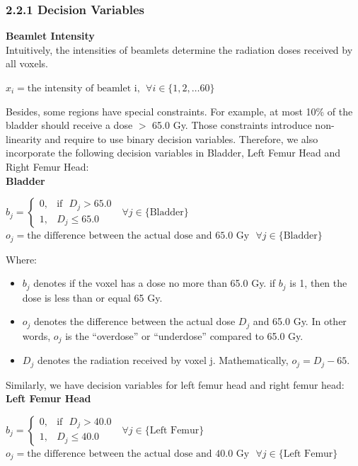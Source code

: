 \documentclass{report}
\begin{document}
\subsubsection{2.2.1 Decision Variables}

\textbf{Beamlet Intensity}\\
Intuitively, the intensities of beamlets determine the radiation doses received by all voxels. 
\begin{center}
    $x_i = \text{the intensity of beamlet i}, ~~ \forall i \in \{1, 2, \dotsc 60\}$
\end{center}

Besides, some regions have special constraints. For example, at most 10\% of the bladder should receive a dose $>$ 65.0 Gy. Those constraints introduce non-linearity and require to use binary decision variables. Therefore, we also incorporate the following decision variables in Bladder, Left Femur Head and Right Femur Head:\\


\textbf{Bladder}
\begin{center}
    $b_j= 
\begin{cases}
    0,& \text{if}~~~ D_j > 65.0\\
    1,              & D_j \leq 65.0
\end{cases} ~~~\forall j \in \{\text{Bladder}\}$\\

    $o_j = \text{the difference between the actual dose and 65.0 Gy} ~~~ \forall j \in \{\text{Bladder}\}$
\end{center}

Where:
\begin{itemize}
    \item $b_j$ denotes if the voxel has a dose no more than 65.0 Gy. if $b_j$ is 1, then the dose is less than or equal 65 Gy.
    \item $o_j$ denotes the difference between the actual dose $D_j$ and 65.0 Gy. In other words, $o_j$ is the ``overdose'' or ``underdose'' compared to 65.0 Gy.
    \item $D_j$ denotes the radiation received by voxel j. Mathematically, $o_j = D_j - 65$.
\end{itemize}

Similarly, we have decision variables for left femur head and right femur head:\\

\textbf{Left Femur Head}
\begin{center}
    $b_j= 
\begin{cases}
    0,& \text{if}~~~ D_j > 40.0\\
    1,              & D_j \leq 40.0
\end{cases} ~~~\forall j \in \{\text{Left Femur}\}$\\

    $o_j = \text{the difference between the actual dose and 40.0 Gy} ~~~ \forall j \in \{\text{Left Femur}\}$
\end{center}
\end{document}
